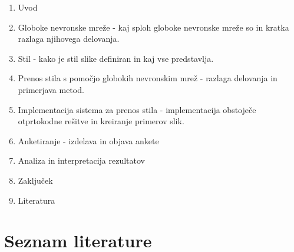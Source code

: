 \documentclass[11pt,a4paper]{article}
\begin{document}
\begin{enumerate}
  \item Uvod
  \item Globoke nevronske mreže - kaj sploh globoke nevronske mreže so in kratka razlaga njihovega delovanja.
  \item Stil - kako je stil slike definiran in kaj vse predstavlja.
  \item Prenos stila s pomočjo globokih nevronskim mrež - razlaga delovanja in primerjava metod.
  \item Implementacija sistema za prenos stila - implementacija obstoječe otprtokodne rešitve in kreiranje primerov slik.
  \item Anketiranje - izdelava in objava ankete
  \item Analiza in interpretacija rezultatov
  \item Zaključek
  \item Literatura
\end{enumerate}

\pagebreak

\section{Seznam literature}





\end{document}
